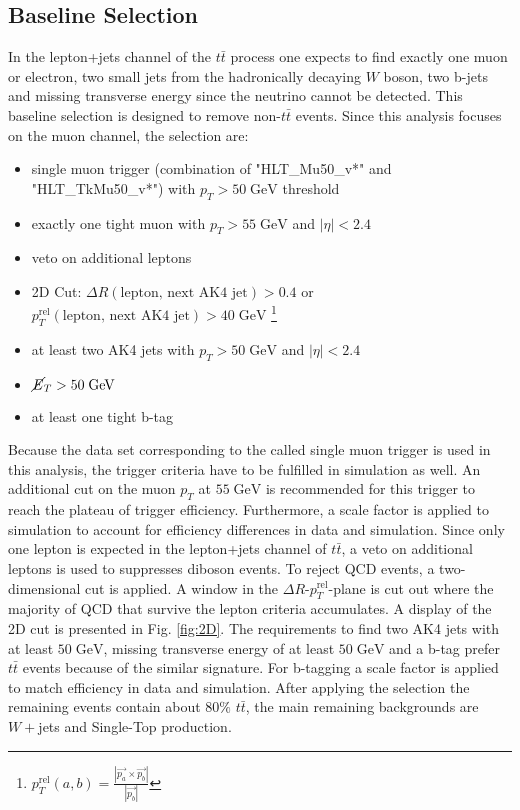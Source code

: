 \subsection{Baseline Selection}
\label{sec:PreSel}
	In the lepton+jets channel of the $t\bar{t}$ process one expects to find exactly one muon or electron, two small jets from the hadronically decaying $W$ boson, two b-jets and missing transverse energy since the neutrino cannot be detected. This baseline selection is designed to remove non-$t\bar{t}$ events. Since this analysis focuses on the muon channel, the selection are:
	\begin{itemize}
	\item single muon trigger (combination of "HLT\_Mu50\_v*" and "HLT\_TkMu50\_v*") with $p_T > 50\;\text{GeV}$ threshold
	\item exactly one tight muon with $p_T > 55\;\text{GeV}$ and $|\eta| < 2.4$
	\item veto on additional leptons
	\item 2D Cut: $\Delta R(\text{lepton, next AK4 jet}) > 0.4$ or $p_T^{\text{rel}}(\text{lepton, next AK4 jet}) > 40\;\text{GeV}$ \footnote{$p_T^{\text{rel}}(a,b) = \frac{|\vec{p_a} \times \vec{p_b}|}{|\vec{p_b}|}$}
	\item at least two AK4 jets with $p_T > 50\;\text{GeV}$ and $|\eta| < 2.4$
	\item $\cancel{E}_T > 50\;\text{GeV}$
	\item at least one tight b-tag

	\end{itemize}
	Because the data set corresponding to the called single muon trigger is used in this analysis, the trigger criteria have to be fulfilled in simulation as well. An additional cut on the muon $p_T$ at $55\;\text{GeV}$ is recommended for this trigger to reach the plateau of trigger efficiency. Furthermore, a scale factor is applied to simulation to account for efficiency differences in data and simulation. Since only one lepton is expected in the lepton+jets channel of $t\bar{t}$, a veto on additional leptons is used to suppresses diboson events. To reject QCD events, a two-dimensional cut is applied. A window in the $\Delta R$-$p_T^{\text{rel}}$-plane is cut out where the majority of QCD that survive the lepton criteria accumulates. A display of the 2D cut is presented in Fig. \ref{fig:2D}. The requirements to find two AK4 jets with at least $50\;\text{GeV}$, missing transverse energy of at least $50\;\text{GeV}$ and a b-tag prefer $t\bar{t}$ events because of the similar signature. For b-tagging a scale factor is applied to match efficiency in data and simulation. After applying the selection the remaining events contain about $80\%$ $t\bar{t}$, the main remaining backgrounds are $W+$jets and Single-Top production. 
	
